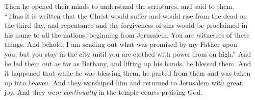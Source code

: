 \begin{biblechapter}
\verse Then he opened their minds to understand the scriptures,
\verse and said to them, “Thus it is written that the Christ would suffer and would rise from the dead on the third day,
\verse and repentance and the forgiveness of sins would be proclaimed in his name to all the nations, beginning from Jerusalem.
\verse You are witnesses of these things.
\verse And behold, I am sending out what was promised by my Father upon you, but you stay in the city until you are clothed with power from on high.”
 And he led them out as far as Bethany, and lifting up his hands, he blessed them.
\verse And it happened that while he was blessing them, he parted from them and was taken up into heaven.
\verse And they worshiped him and returned to Jerusalem with great joy.
\verse And they were \textit{continually} in the temple courts praising God.
\end{biblechapter}

